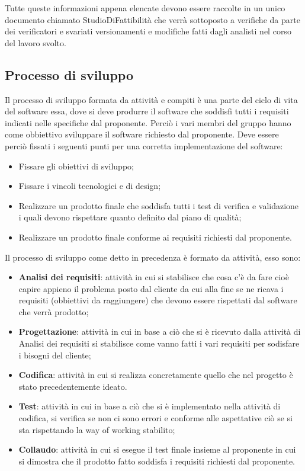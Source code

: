 Tutte queste informazioni appena elencate devono essere raccolte in un unico documento chiamato StudioDiFattibilità che verrà sottoposto a verifiche da parte dei verificatori e svariati versionamenti e modifiche fatti dagli analisti nel corso del lavoro svolto.

\subsection{Processo di sviluppo}
Il processo di sviluppo formata da attività e compiti è una parte del ciclo di vita del software essa, dove si deve produrre il software che soddisfi tutti i requisiti indicati nelle specifiche dal proponente. Perciò i vari membri del gruppo hanno come obbiettivo sviluppare il software richiesto dal proponente. Deve essere perciò fissati i seguenti punti per una corretta implementazione del software:
\begin{itemize}
	\item Fissare gli obiettivi di sviluppo;
	\item Fissare i vincoli tecnologici e di design;
	\item Realizzare un prodotto finale che soddisfa tutti i test di verifica e validazione i quali devono rispettare quanto definito dal piano di qualità;
	\item Realizzare un prodotto finale conforme ai requisiti richiesti dal proponente.
\end{itemize}		
Il processo di sviluppo come detto in precedenza è formato da attività, esso sono:
\begin{itemize}
	\item \textbf{Analisi dei requisiti}: attività in cui si stabilisce che cosa c’è da fare cioè capire appieno il problema posto dal cliente da cui alla fine se ne ricava i requisiti (obbiettivi da raggiungere) che devono essere rispettati dal software che verrà prodotto;
	\item \textbf{Progettazione}: attività in cui in base a ciò che si è ricevuto dalla attività di Analisi dei requisiti si stabilisce come vanno fatti i vari requisiti per sodisfare i bisogni del cliente;
	\item \textbf{Codifica}: attività in cui si realizza concretamente quello che nel progetto è stato precedentemente ideato.
	\item \textbf{Test}: attività in cui in base a ciò che si è implementato nella attività di codifica, si verifica se non ci sono errori e conforme alle aspettative ciò se si sta rispettando la way of working stabilito;
	\item \textbf{Collaudo}: attività in cui si esegue il test finale insieme al proponente in cui si dimostra che il prodotto fatto soddisfa i requisiti richiesti dal proponente.
\end{itemize}
